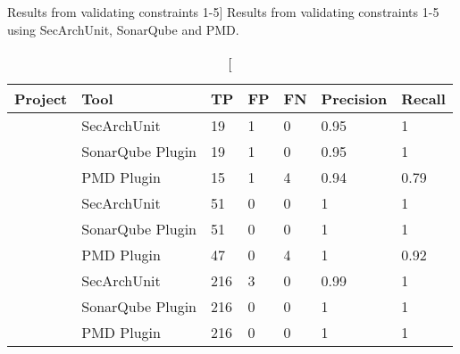 \begin{table}[ht]
\captionsetup{format=hang,justification=raggedright}
\caption
    [Results from validating constraints 1-5]
    {Results from validating constraints 1-5 using SecArchUnit, SonarQube and PMD.}
\begin{center}
\begin{tabular}{lxggggg}
\textbf{Project} & \textbf{Tool} & \textbf{TP} & \textbf{FP} & \textbf{FN} & \textbf{Precision} & \textbf{Recall} \\
\hline
{}
        & SecArchUnit & 19 & 1 & 0 & 0.95 & 1 \\
        & SonarQube Plugin & 19 & 1 & 0 & 0.95 & 1 \\
        & PMD Plugin & 15 & 1 & 4 & 0.94 & 0.79 \\
\hline
{}
        & SecArchUnit & 51 & 0 & 0 & 1 & 1 \\
        & SonarQube Plugin & 51 & 0 & 0 & 1 & 1 \\
        & PMD Plugin & 47 & 0 & 4 & 1 & 0.92 \\
\hline
{}
        & SecArchUnit & 216 & 3 & 0 & 0.99 & 1 \\
        & SonarQube Plugin & 216 & 0 & 0 & 1 & 1 \\
        & PMD Plugin & 216 & 0 & 0 & 1 & 1 \\
\hline
\end{tabular}
\end{center}
\label{tab:results_comparison}
\end{table}